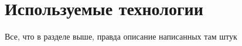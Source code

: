 \section{Используемые технологии}
\label{sec:development}

Все, что в разделе выше, правда описание написанных там штук
